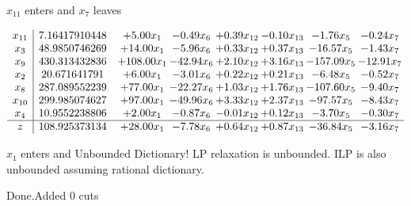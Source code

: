 \documentclass[8pt]{article}
\begin{document}
 $ x_{11} $ enters and $ x_{7} $ leaves 

 \[\begin{array}{c| c c@{\hskip 2pt} c@{\hskip 2pt} c@{\hskip 2pt} c@{\hskip 2pt} c@{\hskip 2pt} c@{\hskip 2pt} }
 x_{11}   &  7.16417910448 & +  5.00 x_{1} & -0.49 x_{6} & +  0.39 x_{12} & -0.10 x_{13} & -1.76 x_{5} & -0.24 x_{7}\\
 x_{3}   &  48.9850746269 & + 14.00 x_{1} & -5.96 x_{6} & +  0.33 x_{12} & +  0.37 x_{13} & -16.57 x_{5} & -1.43 x_{7}\\
 x_{9}   &  430.313432836 & + 108.00 x_{1} & -42.94 x_{6} & +  2.10 x_{12} & +  3.16 x_{13} & -157.09 x_{5} & -12.91 x_{7}\\
 x_{2}   &  20.671641791 & +  6.00 x_{1} & -3.01 x_{6} & +  0.22 x_{12} & +  0.21 x_{13} & -6.48 x_{5} & -0.52 x_{7}\\
 x_{8}   &  287.089552239 & + 77.00 x_{1} & -22.27 x_{6} & +  1.03 x_{12} & +  1.76 x_{13} & -107.60 x_{5} & -9.40 x_{7}\\
 x_{10}   &  299.985074627 & + 97.00 x_{1} & -49.96 x_{6} & +  3.33 x_{12} & +  2.37 x_{13} & -97.57 x_{5} & -8.43 x_{7}\\
 x_{4}   &  10.9552238806 & +  2.00 x_{1} & -0.87 x_{6} & -0.01 x_{12} & +  0.12 x_{13} & -3.70 x_{5} & -0.30 x_{7}\\
\hline
z    &  108.925373134 & + 28.00 x_{1} & -7.78 x_{6} & +  0.64 x_{12} & +  0.87 x_{13} & -36.84 x_{5} & -3.16 x_{7}\\
\end{array}\]


 $ x_{1} $ enters and Unbounded Dictionary!
 LP relaxation is unbounded. ILP is also unbounded assuming rational dictionary. 

Done.Added 0 cuts 
\end{document}
